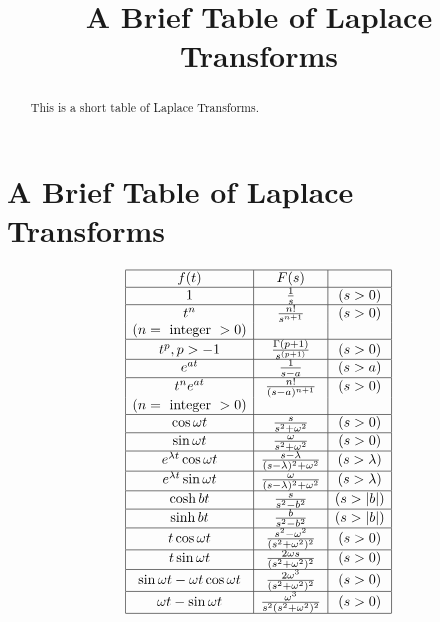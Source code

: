 \documentclass{ximera}
\title{A Brief Table of Laplace Transforms}%
\begin{document}
 
\begin{abstract}
This is a short table of Laplace Transforms.
\end{abstract}
 
\maketitle
 
\section*{A Brief Table of Laplace Transforms}
 
$$
\begin{array}{|c|c|c|}
\hline
    f(t)  &  F(s)  &   \\
\hline
  1  &  \frac{1}{s} & (s > 0)\\
\hline
  t^n  &  \frac{n!}{s^{n+1}}  & (s > 0) \\
  (n = \text{ integer } > 0)  & & \\
\hline
  t^p,  p > -1  & \frac{\Gamma (p+1)}{s^{(p+1)}} & (s>0) \\
\hline
  e^{at}  &  \frac{1}{s-a}  & (s > a) \\
\hline
  t^ne^{at}  &  \frac{n!}{(s-a)^{n+1}}  & (s > 0) \\
  (n= \text{ integer } > 0)  & & \\
\hline 
  \cos \omega t  & \frac{s}{s^2+\omega^2}  & (s > 0) \\
\hline
 \sin \omega t  & \frac{\omega}{s^2+\omega^2}  & (s > 0) \\
\hline
  e^{\lambda t} \cos \omega t  & \frac{s - \lambda}{(s-\lambda)^2+\omega^2}  & (s >
\lambda) \\
\hline
 e^{\lambda t} \sin \omega t  &
\frac{\omega}{(s-\lambda)^2+\omega^2}  & (s >
\lambda) \\
\hline
  \cosh bt  &  \frac{s}{s^2-b^2}  & (s > |b|)\\
  \hline
  \sinh bt  &  \frac{b}{s^2-b^2}  & (s > |b|) \\
  \hline
 t \cos \omega t  &
\frac{s^2-\omega^2}{(s^2+\omega^2)^2}  & (s>0)\\
\hline
  t \sin \omega t  &
\frac{2\omega s}{(s^2+\omega^2)^2}  & (s>0)\\
\hline
  \sin \omega t -\omega t\cos  \omega t
 & \frac{2\omega^3}{(s^2+\omega^2)^2} & (s>0)\\
 \hline
  \omega t - \sin  \omega t   &
\frac{\omega^3}{s^2(s^2+\omega^2)^2} & (s>0) \\
\hline

\end{array}$$
\end{document}
